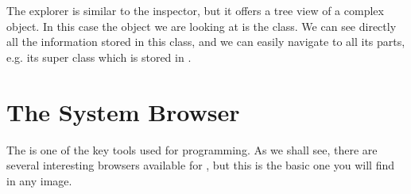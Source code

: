 \documentclass[a4paper,10pt,twoside]{book}
\begin{document}
The explorer is similar to the inspector, but it offers a tree view of a complex object.
In this case the object we are looking at is the  class.
We can see directly all the information stored in this class, and we can easily navigate to all its parts, e.g. its super class which is stored in .

\section{The System Browser}

The  is one of the key tools used for programming.
As we shall see, there are several interesting browsers available for \sq, but this is the basic one you will find in any image.

\end{document}
